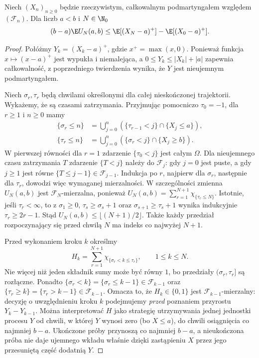 \begin{twierdzenie}
Niech $(X_n)_{n\geq0}$ będzie rzeczywistym,
całkowalnym podmartyngałem względem
$(\mathcal F_n)$. Dla liczb $a<b$ i $N\in\N_0$
\[
(b-a)\E U_N(a,b)
\leq\E[(X_N-a)^+]-\E[(X_0-a)^+].
\]
\end{twierdzenie}
\begin{proof}
Połóżmy $Y_k=(X_k-a)^+$, gdzie
$x^+=\max(x,0)$. Ponieważ funkcja
$x\mapsto(x-a)^+$ jest wypukła i niemalejąca,
a $0\leq Y_k\leq |X_k|+|a|$ zapewnia całkowalność,
z poprzedniego twierdzenia wynika, że $Y$ jest
nieujemnym podmartyngałem.

Niech $\sigma_r,\tau_r$ będą chwilami określonymi
dla całej nieskończonej trajektorii. Wykażemy,
że są czasami zatrzymania.
Przyjmując pomocniczo $\tau_0=-1$, dla $r\geq1$
i $n\geq0$ mamy
\begin{align*}
\{\sigma_r\leq n\}&=\bigcup_{j=0}^n
 (\{\tau_{r-1}<j\}\cap\{X_j\leq a\}),\\
\{\tau_r\leq n\}&=\bigcup_{j=0}^n
 (\{\sigma_r<j\}\cap\{X_j\geq b\}).
\end{align*}
W pierwszej równości dla $r=1$ zdarzenie
$\{\tau_0<j\}$ jest całym $\Omega$.
Dla nieujemnego czasu zatrzymania $T$
zdarzenie $\{T<j\}$ należy do $\mathcal F_j$:
gdy $j=0$ jest puste, a gdy $j\geq1$ jest
równe $\{T\leq j-1\}\in\mathcal F_{j-1}$.
Indukcja po $r$, najpierw dla $\sigma_r$,
następnie dla $\tau_r$, dowodzi więc wymaganej
mierzalności. W szczególności zmienna $U_N(a,b)$ jest
$\mathcal F_N$-mierzalna, ponieważ
$U_N(a,b)=\sum_{r=1}^{N+1}\chi_{\{\tau_r\leq N\}}$.
Istotnie, jeśli $\tau_r<\infty$, to z
$\sigma_1\geq0$, $\tau_s\geq\sigma_s+1$
oraz $\sigma_{s+1}\geq\tau_s+1$ wynika
indukcyjnie $\tau_r\geq2r-1$. Stąd
$U_N(a,b)\leq\lfloor(N+1)/2\rfloor$.
Także każdy przedział rozpoczynający się
przed chwilą $N$ ma indeks co najwyżej $N+1$.

Przed wykonaniem kroku $k$ określmy
\[
H_k=\sum_{r=1}^{N+1}
 \chi_{\{\sigma_r<k\leq\tau_r\}},
 \qquad 1\leq k\leq N.
\]
Nie więcej niż jeden składnik sumy może być równy
$1$, bo przedziały $(\sigma_r,\tau_r]$ są rozłączne.
Ponadto
$\{\sigma_r<k\}=\{\sigma_r\leq k-1\}\in\mathcal F_{k-1}$
oraz $\{\tau_r\geq k\}=\{\tau_r>k-1\}\in\mathcal F_{k-1}$.
Oznacza to, że $H_k\in\{0,1\}$ jest
$\mathcal F_{k-1}$-mierzalny: decyzję o
uwzględnieniu kroku $k$ podejmujemy \emph{przed}
poznaniem przyrostu $Y_k-Y_{k-1}$.
Można interpretować $H$ jako strategię utrzymywania
jednej jednostki procesu $Y$ od chwili, w której
$Y$ wynosi zero (bo $X\leq a$), do chwili osiągnięcia
co najmniej $b-a$. Ukończone próby przynoszą
co najmniej $b-a$, a nieukończona próba nie daje
ujemnego wkładu właśnie dzięki zastąpieniu $X$
przez jego przesuniętą część dodatnią $Y$.


\end{proof}
